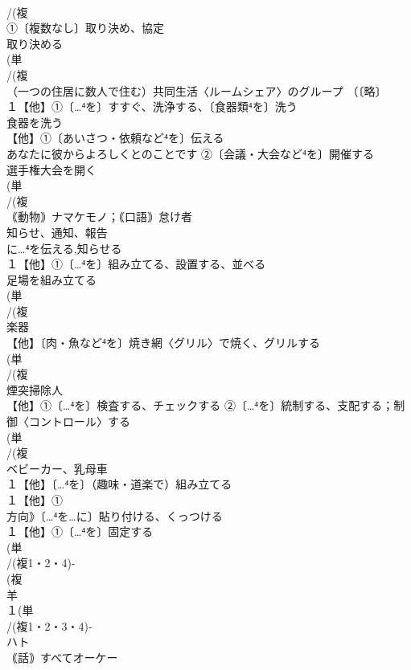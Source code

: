 \documentclass[8pt]{extreport}
\begin{document}
\begin{CJK}{UTF8}{min}
\\	/(複
\\	①〔複数なし〕取り決め、協定 
\\	取り決める
\\	(単
\\	/(複
\\	（一つの住居に数人で住む）共同生活〈ルームシェア〉のグループ （〔略〕
\\	１【他】①〔…⁴を〕すすぐ、洗浄する、〔食器類⁴を〕洗う　
\\	食器を洗う
\\	【他】①〔あいさつ・依頼など⁴を〕伝える 
\\	あなたに彼からよろしくとのことです ②〔会議・大会など⁴を〕開催する 
\\	選手権大会を開く
\\	(単
\\	/(複
\\	｟動物｠ナマケモノ；｟口語｠怠け者 
\\	知らせ、通知、報告 
\\	に…⁴を伝える,知らせる
\\	１【他】①〔…⁴を〕組み立てる、設置する、並べる 
\\	足場を組み立てる 
\\	(単
\\	/(複
\\	楽器 
\\	【他】〔肉・魚など⁴を〕焼き網〈グリル〉で焼く、グリルする 
\\	(単
\\	/(複
\\	煙突掃除人 
\\	【他】①〔…⁴を〕検査する、チェックする ②〔…⁴を〕統制する、支配する；制御〈コントロール〉する 
\\	(単
\\	/(複
\\	ベビーカー、乳母車 
\\	１【他】〔…⁴を〕（趣味・道楽で）組み立てる 
\\	１【他】①
\\	方向》〔…⁴を…に〕貼り付ける、くっつける
\\	１【他】①〔…⁴を〕固定する 
\\	(単
\\	/(複1・2・4)-
\\	(複
\\	羊 
\\	１(単
\\	/(複1・2・3・4)‐
\\	ハト 
\\	｟話｠すべてオーケー 

\end{CJK}
\end{document}
